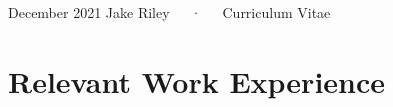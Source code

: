 \documentclass[11pt, a4paper]{awesome-cv}
\begin{document}
\makecvheader

\makecvfooter
  {December 2021}
    {Jake Riley~~~·~~~Curriculum Vitae}
  {\thepage}





\hypertarget{relevant-work-experience}{%
\section{\texorpdfstring{ Relevant Work
Experience}{ Relevant Work Experience}}\label{relevant-work-experience}}
\end{document}
